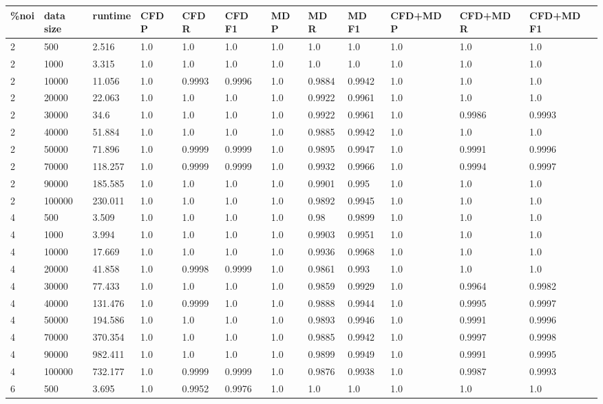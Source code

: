 \begin{table*}[!htbp]
\begin{tabular}{@{}llllllllllll@{}}
\toprule
\%noi & data size & runtime & CFD P & CFD R & CFD F1 & MD P & MD R & MD F1 & CFD+MD P & CFD+MD R & CFD+MD F1 \\ \midrule

2&500&2.516&1.0&1.0&1.0&1.0&1.0&1.0&1.0&1.0&1.0 \\
2&1000&3.315&1.0&1.0&1.0&1.0&1.0&1.0&1.0&1.0&1.0 \\
2&10000&11.056&1.0&0.9993&0.9996&1.0&0.9884&0.9942&1.0&1.0&1.0 \\
2&20000&22.063&1.0&1.0&1.0&1.0&0.9922&0.9961&1.0&1.0&1.0 \\
2&30000&34.6&1.0&1.0&1.0&1.0&0.9922&0.9961&1.0&0.9986&0.9993 \\
2&40000&51.884&1.0&1.0&1.0&1.0&0.9885&0.9942&1.0&1.0&1.0 \\
2&50000&71.896&1.0&0.9999&0.9999&1.0&0.9895&0.9947&1.0&0.9991&0.9996 \\
2&70000&118.257&1.0&0.9999&0.9999&1.0&0.9932&0.9966&1.0&0.9994&0.9997 \\
2&90000&185.585&1.0&1.0&1.0&1.0&0.9901&0.995&1.0&1.0&1.0 \\
2&100000&230.011&1.0&1.0&1.0&1.0&0.9892&0.9945&1.0&1.0&1.0 \\
4&500&3.509&1.0&1.0&1.0&1.0&0.98&0.9899&1.0&1.0&1.0 \\
4&1000&3.994&1.0&1.0&1.0&1.0&0.9903&0.9951&1.0&1.0&1.0 \\
4&10000&17.669&1.0&1.0&1.0&1.0&0.9936&0.9968&1.0&1.0&1.0 \\
4&20000&41.858&1.0&0.9998&0.9999&1.0&0.9861&0.993&1.0&1.0&1.0 \\
4&30000&77.433&1.0&1.0&1.0&1.0&0.9859&0.9929&1.0&0.9964&0.9982 \\
4&40000&131.476&1.0&0.9999&1.0&1.0&0.9888&0.9944&1.0&0.9995&0.9997 \\
4&50000&194.586&1.0&1.0&1.0&1.0&0.9893&0.9946&1.0&0.9991&0.9996 \\
4&70000&370.354&1.0&1.0&1.0&1.0&0.9885&0.9942&1.0&0.9997&0.9998 \\
4&90000&982.411&1.0&1.0&1.0&1.0&0.9899&0.9949&1.0&0.9991&0.9995 \\
4&100000&732.177&1.0&0.9999&0.9999&1.0&0.9876&0.9938&1.0&0.9987&0.9993 \\
6&500&3.695&1.0&0.9952&0.9976&1.0&1.0&1.0&1.0&1.0&1.0 \\

\end{tabular}
\end{table*}
